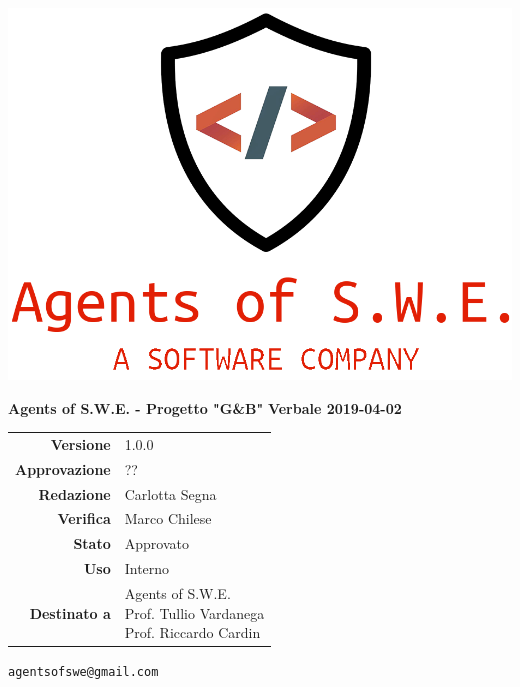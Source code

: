 


\begin{titlepage}
\thispagestyle{empty}

\begin{center}

\includegraphics[scale=0.3]{./images/logo.png} 




\large \textbf{Agents of S.W.E. - Progetto "G\&B"}
\vfill
\Huge \textbf{Verbale 2019-04-02}
\vfill
\large
\renewcommand{\arraystretch}{1.3}
\begin{tabular}{r|l}
\textbf{Versione} & 1.0.0\\
\textbf{Approvazione} & {??}\\
\textbf{Redazione} & \parbox[t]{5cm}{Carlotta Segna}\\
\textbf{Verifica} & \parbox[t]{5cm}{Marco Chilese}\\
\textbf{Stato} & Approvato\\
\textbf{Uso} & Interno\\
\textbf{Destinato a} & \parbox[t]{5cm}{Agents of S.W.E. \\Prof. Tullio Vardanega\\Prof. Riccardo Cardin}
\end{tabular}
\vfill
\small
\texttt{agentsofswe@gmail.com}
\end{center}
\end{titlepage}

\pagebreak



\pagebreak


\pagebreak


\pagebreak








